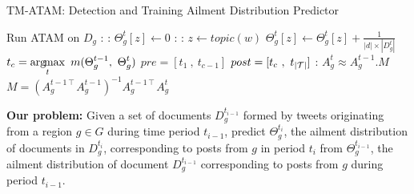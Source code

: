 \begin{algorithm}[t!]
\caption{TM-ATAM: \change Detection and Training Ailment Distribution Predictor}
\label{alg:tmatam}
\begin{algorithmic}[1]
 \label{alg:line:start}
 \State Run ATAM on $D_g$\label{alg:line:atam}
 :\label{alg:line:tstart}
 :\label{alg:line:createThetaStart}
 \State $\Theta_g^t[z] \leftarrow 0$
 \EndFor
 :
 :
 \State $z \gets topic(w)$
 \State $\Theta_g^t[z] \gets \Theta_g^t[z] + \frac{1}{|d|\times |D_g^t|}$
 \EndFor
 \EndFor\label{alg:line:createThetaEnd}
 \EndFor
 \State $\displaystyle t_{c} = \argmax_t{\ m(\Theta_g^{t-1},\ \Theta_g^{t})}$\label{alg:line:ThetaDiff}
 \State $pre = [t_1\ ,\ t_{c-1}]$\label{alg:line:buildSeasonPre} 
 \State $post = [t_{c}\ , \ t_{|\mathcal{T}|}]$\label{alg:line:buildSeasonPost} 
 :\label{alg:line:predStart}
 \State $A_g^t\approx A_g^{t-1}.M$
 \State $M =(A_g^{t-1\intercal}A_g^{t-1})^{-1}A_g^{t-1\intercal}A_g^t$
 \EndFor\label{alg:line:predEnd}
\EndFor\label{alg:line:end}
\end{algorithmic}
\end{algorithm}

\label{subsec:problem}
{\bf Our problem:} Given a set of
documents $D_g^{t_{i-1}}$ formed by tweets originating from a region
$g \in G$ during time period $t_{i-1}$, predict $\Theta_g^{t_i}$, the
ailment distribution of documents in $D_g^{t_i}$, corresponding to
posts from $g$ in period $t_i$ from $\Theta_g^{t_{i-1}}$, the ailment
distribution of document $D_g^{t_{i-1}}$ corresponding to posts from
$g$ during period $t_{i-1}$.
